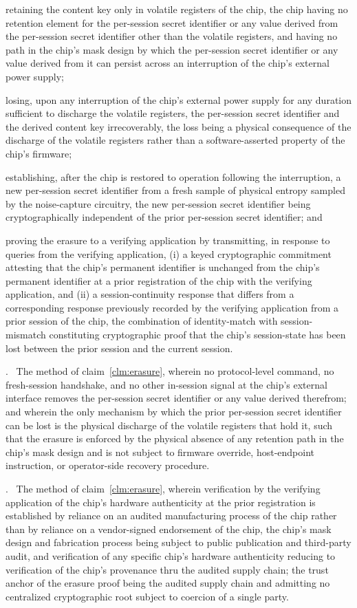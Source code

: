 \documentclass[12pt,letterpaper]{article}
\newcounter{claim}
\newcommand{\claim}[1]{\medskip\par\refstepcounter{claim}\noindent\arabic{claim}.~\label{clm:#1}\ignorespaces}
\newcommand{\clm}[1]{claim~\ref{clm:#1}}
\begin{document}
retaining the content key only in volatile registers of the chip, the chip having no retention element for the per-session secret identifier or any value derived from the per-session secret identifier other than the volatile registers, and having no path in the chip's mask design by which the per-session secret identifier or any value derived from it can persist across an interruption of the chip's external power supply;

losing, upon any interruption of the chip's external power supply for any duration sufficient to discharge the volatile registers, the per-session secret identifier and the derived content key irrecoverably, the loss being a physical consequence of the discharge of the volatile registers rather than a software-asserted property of the chip's firmware;

establishing, after the chip is restored to operation following the interruption, a new per-session secret identifier from a fresh sample of physical entropy sampled by the noise-capture circuitry, the new per-session secret identifier being cryptographically independent of the prior per-session secret identifier; and

proving the erasure to a verifying application by transmitting, in response to queries from the verifying application, (i) a keyed cryptographic commitment attesting that the chip's permanent identifier is unchanged from the chip's permanent identifier at a prior registration of the chip with the verifying application, and (ii) a session-continuity response that differs from a corresponding response previously recorded by the verifying application from a prior session of the chip, the combination of identity-match with session-mismatch constituting cryptographic proof that the chip's session-state has been lost between the prior session and the current session.

\claim{erasureonly} The method of \clm{erasure}, wherein no protocol-level command, no fresh-session handshake, and no other in-session signal at the chip's external interface removes the per-session secret identifier or any value derived therefrom; and wherein the only mechanism by which the prior per-session secret identifier can be lost is the physical discharge of the volatile registers that hold it, such that the erasure is enforced by the physical absence of any retention path in the chip's mask design and is not subject to firmware override, host-endpoint instruction, or operator-side recovery procedure.

\claim{supplychain} The method of \clm{erasure}, wherein verification by the verifying application of the chip's hardware authenticity at the prior registration is established by reliance on an audited manufacturing process of the chip rather than by reliance on a vendor-signed endorsement of the chip, the chip's mask design and fabrication process being subject to public publication and third-party audit, and verification of any specific chip's hardware authenticity reducing to verification of the chip's provenance thru the audited supply chain; the trust anchor of the erasure proof being the audited supply chain and admitting no centralized cryptographic root subject to coercion of a single party.
\end{document}
